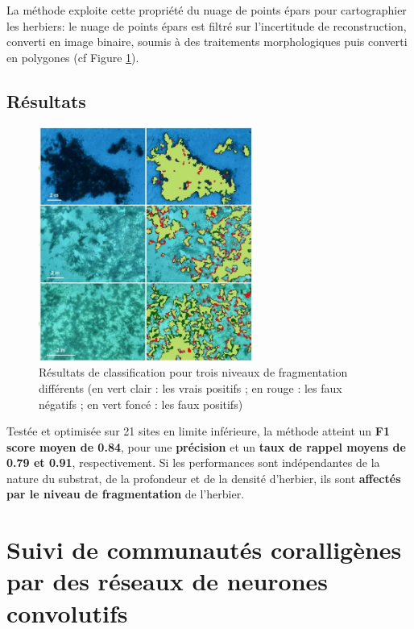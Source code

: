 La méthode exploite cette propriété du nuage de points épars pour cartographier les herbiers: le nuage de points épars est filtré sur l’incertitude de reconstruction, converti en image binaire, soumis à des traitements morphologiques puis converti en polygones (cf Figure \ref{figureB.2}).

\newpage
\subsection*{Résultats}
\begin{figure} 
	\includegraphics[width=7cm]{images/appendix_merigeo/Figure2.jpg}
		\caption[Résultats de classification pour trois niveaux de fragmentation différents]{Résultats de classification pour trois niveaux de fragmentation différents (en vert clair : les vrais positifs ; en rouge : les faux négatifs ; en vert foncé : les faux positifs)}
	\label{figureB.2}
\end{figure}
Testée et optimisée sur 21 sites en limite inférieure, la méthode atteint un \textbf{F1 score moyen de 0.84}, pour une \textbf{précision} et un \textbf{taux de rappel moyens de 0.79 et 0.91}, respectivement. Si les performances sont indépendantes de la nature du substrat, de la profondeur et de la densité d’herbier, ils sont \textbf{affectés par le niveau de fragmentation} de l’herbier. 


\bigskip

\section*{Suivi de communautés coralligènes par des réseaux de neurones convolutifs}

